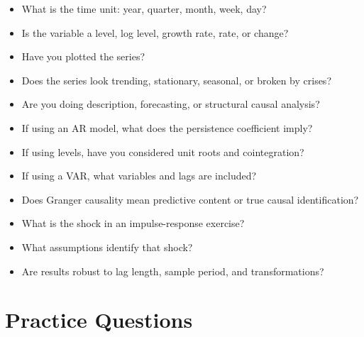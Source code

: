 \begin{itemize}
    \item What is the time unit: year, quarter, month, week, day?
    \item Is the variable a level, log level, growth rate, rate, or change?
    \item Have you plotted the series?
    \item Does the series look trending, stationary, seasonal, or broken by crises?
    \item Are you doing description, forecasting, or structural causal analysis?
    \item If using an AR model, what does the persistence coefficient imply?
    \item If using levels, have you considered unit roots and cointegration?
    \item If using a VAR, what variables and lags are included?
    \item Does Granger causality mean predictive content or true causal identification?
    \item What is the shock in an impulse-response exercise?
    \item What assumptions identify that shock?
    \item Are results robust to lag length, sample period, and transformations?
\end{itemize}

\section{Practice Questions}

